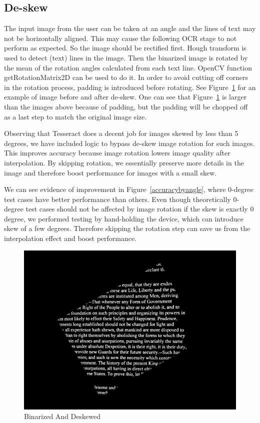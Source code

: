 \documentclass[conference]{IEEEtran}
\begin{document}
\subsection{De-skew}

The input image from the user can be taken at an angle and the lines of text may not be horizontally aligned.\cite{Tsai} This may cause the following OCR stage to not perform as expected. So the image should be rectified first.  Hough transform is used to detect (text) lines in the image.  Then the binarized image is rotated by the mean of the rotation angles calculated from each text line.  OpenCV function getRotationMatrix2D can be used to do it.  In order to avoid cutting off corners in the rotation process, padding is introduced before rotating.  See Figure~\ref{deskewed} for an example of image before and after de-skew.  One can see that Figure~\ref{deskewed} is larger than the images above because of padding, but the padding will be chopped off as a last step to match the original image size.

Observing that Tesseract does a decent job for images skewed by less than 5 degrees, we have included logic to bypass de-skew image rotation for such images.  This improves accuracy because image rotation lowers image quality after interpolation.  By skipping rotation, we essentially preserve more details in the image and therefore boost performance for images with a small skew.

We can see evidence of improvement in Figure~\ref{accuracybyangle}, where 0-degree test cases have better performance than others.  Even though theoretically 0-degree test cases should not be affected by image rotation if the skew is exactly 0 degree, we performed testing by hand-holding the device, which can introduce skew of a few degrees.  Therefore skipping the rotation step can save us from the interpolation effect and boost performance.

\begin{figure}
\center
\includegraphics[scale=0.10]{deskewedImage.jpg}
\caption{Binarized And Deskewed}
\label{deskewed}
\end{figure}
\end{document}
